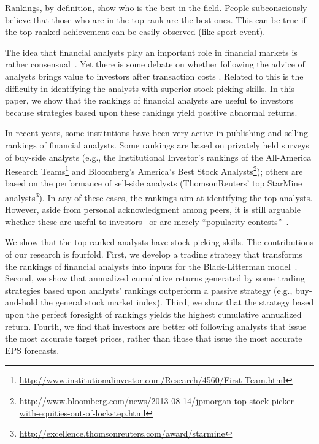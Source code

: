 Rankings, by definition, show who is the best in the field. People subconsciously believe that those who are in the top rank are the best ones. This can be true if the top ranked achievement can be easily observed (like sport event). 



The idea that financial analysts play an important role in financial markets is rather consensual~\citep{cowles1933csm,obrien1990}. Yet there is some debate on whether following the advice of analysts brings value to investors after transaction costs \citep{womack1996,mikhail2004sae,li2005persistence}. Related to this is the difficulty in identifying the analysts with superior stock picking skills. In this paper, we show that the rankings of financial analysts are useful to investors because strategies based upon these rankings yield positive abnormal returns.



In recent years, some institutions have been very active in publishing and  selling  rankings of financial analysts. Some rankings  are based on privately held surveys of  buy-side analysts (e.g., the Institutional Investor's rankings of the All-America Research Teams\footnote{\url{http://www.institutionalinvestor.com/Research/4560/First-Team.html}} and Bloomberg's America's Best Stock Analysts\footnote{\sloppy \url{http://www.bloomberg.com/news/2013-08-14/jpmorgan-top-stock-picker-with-equities-out-of-lockstep.html}}); others are based on the performance of sell-side analysts (ThomsonReuters' top StarMine analysts\footnote{\url{http://excellence.thomsonreuters.com/award/starmine}}). In any of these cases, the rankings aim at identifying the top analysts. However, aside from personal acknowledgment among peers, it is still arguable whether these are useful to investors~\citep{desai2000ass} or are merely ``popularity contests''~\citep{emery2009}. %


We show that the top ranked analysts have stock picking skills. The contributions of our research is fourfold. First, we develop a trading strategy that transforms the rankings of financial analysts into inputs for the Black-Litterman model~\citep{black1992}. Second, we show that annualized cumulative returns generated by some trading strategies  based upon analysts' rankings outperform a passive strategy (e.g., buy-and-hold the general stock market index). Third, we show that the strategy based upon the perfect foresight of rankings yields the highest cumulative annualized return. Fourth, we find that investors  are better off following analysts that issue the most accurate target prices, rather than those that issue the most accurate EPS forecasts.


